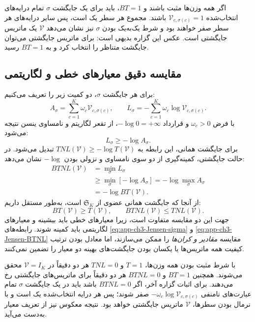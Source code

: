 اگر همه وزن‌ها مثبت باشند و $BT=1$، باید برای یک جایگشت $\sigma$ تمام درایه‌های انتخاب‌شده $\mathcal V_{c,\sigma(c)}=1$ باشند. مجموع هر سطر یک است، پس سایر درایه‌های هر سطر صفر خواهند بود و شرط یک‌به‌یک بودن $\sigma$ نیز نشان می‌دهد $\mathcal V$ یک ماتریس جایگشتی است. عکس این گزاره بدیهی است: برای ماتریس جایگشتی می‌توان جایگشت متناظر را انتخاب کرد و به $BT=1$ رسید.

\subsection{مقایسه دقیق معیارهای خطی و لگاریتمی}
\label{app:ch3-four-criteria-comparison}
برای هر جایگشت $\sigma$، دو کمیت زیر را تعریف می‌کنیم:
\begin{equation}\label{eq:app-ch3-compare-score}
A_\sigma=\sum_{c=1}^{K}\omega_c\mathcal V_{c,\sigma(c)},
\qquad
L_\sigma=-\sum_{c=1}^{K}\omega_c\log\mathcal V_{c,\sigma(c)}.
\end{equation}
با فرض $\omega_c>0$ و قرارداد $-\log0=+\infty$، از تقعر لگاریتم و نامساوی ینسن نتیجه می‌شود:
\begin{equation}\label{eq:app-ch3-Jensen-sigma}
L_\sigma\ge-\log A_\sigma.
\end{equation}
برای جایگشت همانی، این رابطه به $TNL(\mathcal V)\ge-\log T(\mathcal V)$ تبدیل می‌شود. در حالت جایگشتی، کمینه‌گیری از دو سوی نامساوی و نزولی بودن $-\log$ نشان می‌دهد:
\begin{equation}\label{eq:app-ch3-Jensen-BTNL}
\begin{aligned}
BTNL(\mathcal V)
&=\min_\sigma L_\sigma\\
&\ge\min_\sigma[-\log A_\sigma]
=-\log\max_\sigma A_\sigma\\
&=-\log BT(\mathcal V).
\end{aligned}
\end{equation}
از آنجا که جایگشت همانی عضوی از $\mathfrak{S}_K$ است، به‌طور مستقل داریم:
\begin{equation}\label{eq:app-ch3-identity-compare}
BT(\mathcal V)\ge T(\mathcal V),
\qquad
BTNL(\mathcal V)\le TNL(\mathcal V).
\end{equation}
جهت این دو مقایسه متفاوت است، زیرا معیارهای خطی باید بیشینه و معیارهای لگاریتمی باید کمینه شوند. رابطه‌های \eqref{eq:app-ch3-Jensen-sigma} و \eqref{eq:app-ch3-Jensen-BTNL} مقایسه \emph{مقادیر و کران‌ها} را ممکن می‌سازند، اما معادل بودن ترتیب کیفیت همه ماتریس‌ها یا یکسان بودن جایگشت‌های بهینه دو معیار را تضمین نمی‌کنند.

با شرط مثبت بودن همه وزن‌ها، $T=1$ و $TNL=0$ هر دو دقیقاً در $\mathcal V=I_K$ محقق می‌شوند. همچنین $BT=1$ و $BTNL=0$ هر دو دقیقاً برای ماتریس‌های جایگشتی رخ می‌دهند. برای اثبات گزاره آخر، اگر $BTNL=0$ باشد باید در یک جایگشت $\sigma$ تمام عبارت‌های نامنفی $-\omega_c\log\mathcal V_{c,\sigma(c)}$ صفر شوند؛ پس هر درایه انتخاب‌شده یک است و با نرمال بودن سطرها، $\mathcal V$ ماتریس جایگشتی خواهد بود. نتیجه معکوس نیز از تعریف معیار به‌دست می‌آید.


